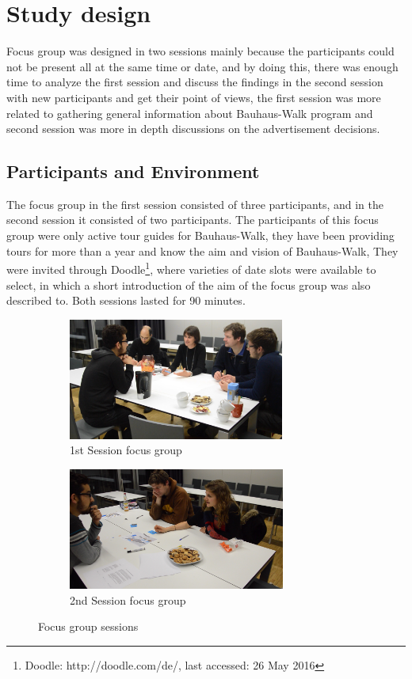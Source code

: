 \section{Study design}
Focus group was designed in two sessions mainly because the participants could not be present all at the same time or date, and by doing this, there was enough time to analyze the first session and discuss the findings in the second session with new participants and get their point of views, the first session was more related to gathering general information about Bauhaus-Walk program and second session was more in depth discussions on the advertisement decisions.

\subsection{Participants and Environment}
The focus group in the first session consisted of three participants, and in the second session it consisted of two participants. The participants of this focus group were only active tour guides for Bauhaus-Walk, they have been providing tours for more than a year and know the aim and vision of Bauhaus-Walk, They were invited through Doodle\footnote{Doodle: http://doodle.com/de/, last accessed: 26 May 2016}, where varieties of date slots were available to select, in which a short introduction of the aim of the focus group was also described to. Both sessions lasted for 90 minutes.

\begin{figure}[H]
    \centering
    \begin{subfigure}[H]{0.45\textwidth}
        \centering
        \includegraphics[width=\textwidth,height=4cm]{Figures/4/focus_group_s1}
        \caption{1st Session focus group }
        \label{fig:focus_group_s1}
    \end{subfigure}
    \begin{subfigure}[H]{0.45\textwidth}
        \centering
        \includegraphics[width=\textwidth,height=4cm]{Figures/4/focus_group_s2}
        \caption{2nd Session focus group}
        \label{fig:focus_group_s2}
    \end{subfigure}
    \caption{Focus group sessions}
    \label{fig:Focus_group_sessions}
\end{figure}

